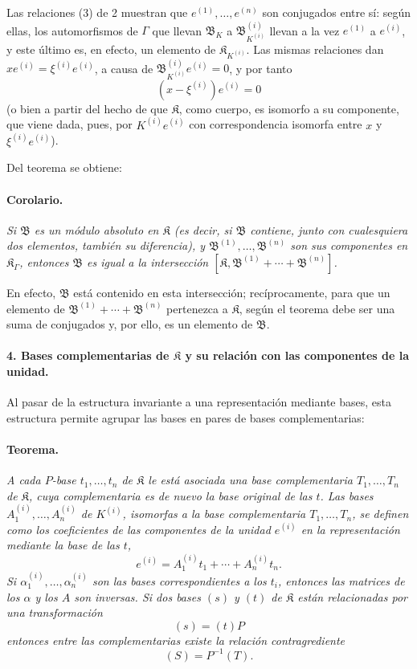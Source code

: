 Las relaciones (3) de 2 muestran que $e^{(1)},\ldots,e^{(n)}$ son conjugados entre sí: según ellas, los automorfismos de $\Gamma$ que llevan $\mathfrak B_K$ a $\mathfrak B_{K^{(i)}}^{(i)}$ llevan a la vez $e^{(1)}$ a $e^{(i)}$, y este último es, en efecto, un elemento de $\mathfrak K_{K^{(i)}}$. Las mismas relaciones dan $xe^{(i)}=\xi^{(i)}e^{(i)}$, a causa de $\mathfrak B_{K^{(i)}}^{(i)}e^{(i)}=0$, y por tanto
\[
(x-\xi^{(i)})e^{(i)}=0
\]
(o bien a partir del hecho de que $\mathfrak K$, como cuerpo, es isomorfo a su componente, que viene dada, pues, por $K^{(i)}e^{(i)}$ con correspondencia isomorfa entre $x$ y $\xi^{(i)}e^{(i)}$).

Del teorema se obtiene:

\paragraph{Corolario.}
\emph{Si $\mathfrak B$ es un módulo absoluto en $\mathfrak K$ (es decir, si $\mathfrak B$ contiene, junto con cualesquiera dos elementos, también su diferencia), y $\mathfrak B^{(1)},\ldots,\mathfrak B^{(n)}$ son sus componentes en $\mathfrak K_\Gamma$, entonces $\mathfrak B$ es igual a la intersección $[\mathfrak K,\mathfrak B^{(1)}+\cdots+\mathfrak B^{(n)}]$.}

En efecto, $\mathfrak B$ está contenido en esta intersección; recíprocamente, para que un elemento de $\mathfrak B^{(1)}+\cdots+\mathfrak B^{(n)}$ pertenezca a $\mathfrak K$, según el teorema debe ser una suma de conjugados y, por ello, es un elemento de $\mathfrak B$.

\paragraph{4. Bases complementarias de $\mathfrak K$ y su relación con las componentes de la unidad.}
Al pasar de la estructura invariante a una representación mediante bases, esta estructura permite agrupar las bases en pares de bases complementarias:

\paragraph{Teorema.}
\emph{A cada $P$-base $t_1,\ldots,t_n$ de $\mathfrak K$ le está asociada una base complementaria $T_1,\ldots,T_n$ de $\mathfrak K$, cuya complementaria es de nuevo la base original de las $t$. Las bases $A_1^{(i)},\ldots,A_n^{(i)}$ de $K^{(i)}$, isomorfas a la base complementaria $T_1,\ldots,T_n$, se definen como los coeficientes de las componentes de la unidad $e^{(i)}$ en la representación mediante la base de las $t$,
\[
e^{(i)}=A_1^{(i)}t_1+\cdots+A_n^{(i)}t_n.
\]
Si $\alpha_1^{(i)},\ldots,\alpha_n^{(i)}$ son las bases correspondientes a los $t_i$, entonces las matrices de los $\alpha$ y los $A$ son inversas. Si dos bases $(s)$ y $(t)$ de $\mathfrak K$ están relacionadas por una transformación
\[
(s)=(t)P
\]
entonces entre las complementarias existe la relación contragrediente
\[
(S)=P^{-1}(T).
\]}

